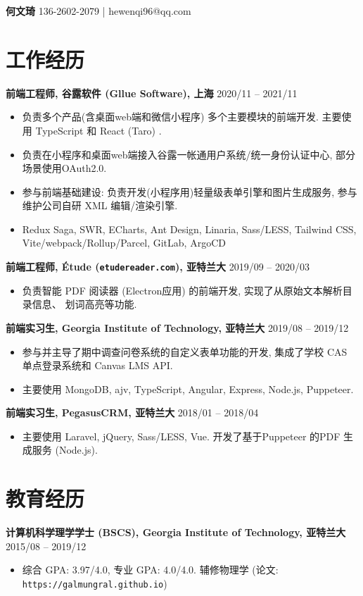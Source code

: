 \documentclass[10pt]{article}
\begin{document}
{\bf\huge 何文琦} \hfill 136-2602-2079 | hewenqi96@qq.com

\section*{工作经历}
\textbf{前端工程师, 谷露软件 (Gllue Software), 上海} \hfill 2020/11 -- 2021/11
\begin{itemize}
\item 负责多个产品(含桌面web端和微信小程序) 多个主要模块的前端开发. 主要使用 TypeScript 和 React  (Taro) .
\item 负责在小程序和桌面web端接入谷露一帐通用户系统/统一身份认证中心, 部分场景使用OAuth2.0.
\item 参与前端基础建设: 负责开发(小程序用)轻量级表单引擎和图片生成服务, 参与维护公司自研 XML 编辑/渲染引擎.
\item {\small Redux Saga, SWR, ECharts, Ant Design, Linaria, Sass/LESS, Tailwind CSS, Vite/webpack/Rollup/Parcel, GitLab, ArgoCD}
\end{itemize}

\vspace{0.5em}
\textbf{前端工程师, Étude (\texttt{etudereader.com}), 亚特兰大} \hfill 2019/09 -- 2020/03
\begin{itemize}
\item 负责智能 PDF 阅读器 (Electron应用) 的前端开发, 实现了从原始文本解析目录信息、 划词高亮等功能.
\end{itemize}

\vspace{0.5em}
\textbf{前端实习生, Georgia Institute of Technology, 亚特兰大} \hfill 2019/08 -- 2019/12
\begin{itemize}
\item 参与并主导了期中调查问卷系统的自定义表单功能的开发, 集成了学校 CAS 单点登录系统和 Canvas LMS API.
\item 主要使用 MongoDB, ajv, TypeScript, Angular, Express,  Node.js, Puppeteer.
\end{itemize}

\vspace{0.5em}
\textbf{前端实习生, PegasusCRM, 亚特兰大} \hfill 2018/01 -- 2018/04
\begin{itemize}
\item 主要使用 Laravel, jQuery, Sass/LESS, Vue.  开发了基于Puppeteer 的PDF 生成服务 (Node.js).
\end{itemize}


\section*{教育经历}
\textbf{计算机科学理学学士 (BSCS), Georgia Institute of Technology, 亚特兰大} \hfill 2015/08 -- 2019/12
\begin{itemize}
\item  综合 GPA: 3.97/4.0, 专业 GPA: 4.0/4.0. 辅修物理学 (论文: \texttt{https://galmungral.github.io})
\end{itemize} 
\end{document}
